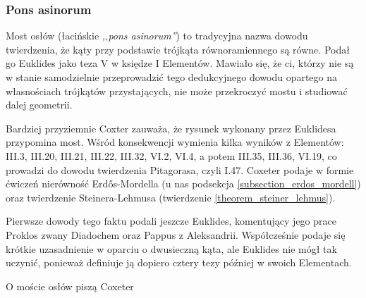 %


\subsubsection{Pons asinorum}
Most osłów (łacińskie \emph{,,pons asinorum''}) to tradycyjna nazwa dowodu twierdzenia, że kąty przy podstawie trójkąta równoramiennego są równe.
Podał go Euklides jako teza V w księdze I Elementów.
Mawiało się, że ci, którzy nie są w stanie samodzielnie przeprowadzić tego dedukcyjnego dowodu opartego na własnościach trójkątów przystających, nie może przekroczyć mostu i studiować dalej geometrii.

Bardziej przyziemnie Coxter \cite[s. 6-9]{coxeter_1991} zauważa, że rysunek wykonany przez Euklidesa przypomina most.
Wśród konsekwencji wymienia kilka wyników z Elementów: III.3, III.20, III.21, III.22, III.32, VI.2, VI.4, a potem III.35, III.36, VI.19, co prowadzi do dowodu twierdzenia Pitagorasa, czyli I.47. %
%
Coxeter podaje w formie ćwiczeń nierówność Erdős-Mordella (u nas podsekcja \ref{subsection_erdos_mordell}) oraz twierdzenie Steinera-Lehmusa (twierdzenie \ref{theorem_steiner_lehmus}).

Pierwsze dowody tego faktu podali jeszcze Euklides, komentujący jego prace Proklos zwany Diadochem oraz Pappus z Aleksandrii.
Współcześnie podaje się krótkie uzasadnienie w oparciu o dwusieczną kąta, ale Euklides nie mógł tak uczynić, ponieważ definiuje ją dopiero cztery tezy później w swoich Elementach.

O moście osłów piszą Coxeter 


%